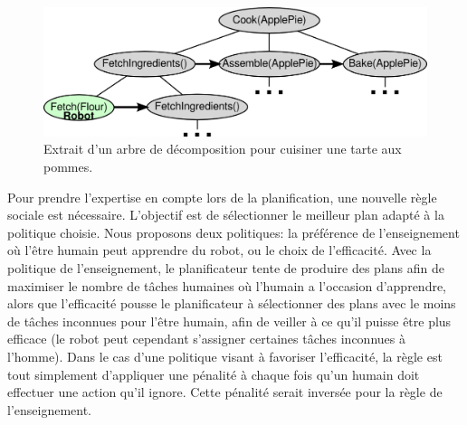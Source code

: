 \documentclass[a4paper,11pt,twoside]{StyleThese}
\begin{document}
\begin{figure}[ht!]
 \centering
  \includegraphics[width=0.77
 \textwidth]{img/plan.png}
 \caption{Extrait d'un arbre de décomposition pour cuisiner une tarte aux pommes.}
 \label{fig:treePlan}
 \end{figure}
 
Pour prendre l'expertise en compte lors de la planification, une nouvelle règle sociale est nécessaire. L'objectif est de sélectionner le meilleur plan adapté à la politique choisie. Nous proposons deux politiques: la préférence de l'enseignement où l'être humain peut apprendre du robot, ou le choix de l'efficacité. Avec la politique de l'enseignement, le planificateur tente de produire des plans afin de maximiser le nombre de tâches humaines où l'humain a l'occasion d'apprendre, alors que l'efficacité pousse le planificateur à sélectionner des plans avec le moins de tâches inconnues pour l'être humain, afin de veiller à ce qu'il puisse être plus efficace (le robot peut cependant s'assigner certaines tâches inconnues à l'homme).
Dans le cas d'une politique visant à favoriser l'efficacité, la règle est tout simplement d'appliquer une pénalité à chaque fois qu'un humain doit effectuer une action qu'il ignore. Cette pénalité serait inversée pour la règle de l'enseignement.
\end{document}
